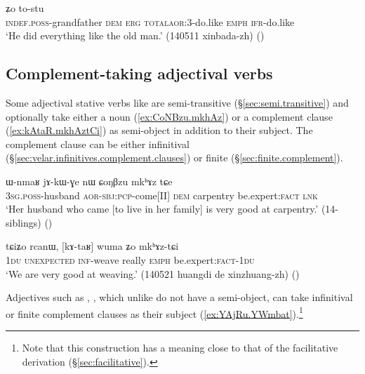 \begin{exe}
\ex \label{ex:tWtastu.tostu2}
 ʑo to-stu \\
\textsc{indef}.\textsc{poss}-grandfather \textsc{dem} \textsc{erg} \textsc{total}\redp{}\textsc{aor}:3\flobv{}-do.like \textsc{emph} \textsc{ifr}-do.like  \\
\glt `He did everything like the old man.' (140511 xinbada-zh)
()
\end{exe}

\subsection{Complement-taking adjectival verbs} \label{sec:adjective.complement}
Some adjectival stative verbs like  are semi-transitive (§\ref{sec:semi.transitive}) and optionally take either a noun (\ref{ex:CoNBzu.mkhAz}) or a complement clause (\ref{ex:kAtaR.mkhAztCi}) as semi-object in addition to their subject. The complement clause can be either infinitival (§\ref{sec:velar.infinitives.complement.clauses}) or finite (§\ref{sec:finite.complement}).

\begin{exe}
\ex \label{ex:CoNBzu.mkhAz}
\gll ɯ-nmaʁ jɤ-kɯ-ɣe nɯ ɕoŋβzu mkʰɤz tɕe \\
\textsc{3sg}.\textsc{poss}-husband \textsc{aor}-\textsc{sbj}:\textsc{pcp}-come[II] \textsc{dem} carpentry be.expert:\textsc{fact} \textsc{lnk} \\
\glt `Her husband who came [to live in her family] is very good at carpentry.' (14-siblings)
()
\end{exe}

\begin{exe}
\ex \label{ex:kAtaR.mkhAztCi}
\gll tɕiʑo rcanɯ, [kɤ-taʁ] wuma ʑo mkʰɤz-tɕi 	 \\
\textsc{1du}  \textsc{unexpected} \textsc{inf}-weave really \textsc{emph} be.expert:\textsc{fact}-\textsc{1du} \\
\glt `We are very good at weaving.' (140521 huangdi de xinzhuang-zh)
()
\end{exe}


Adjectives such as , , which unlike  do not have a semi-object, can take infinitival or finite complement clauses as their subject (\ref{ex:YAjRu.YWmbat}).\footnote{Note that this construction has a meaning close to that of the facilitative  derivation (§\ref{sec:facilitative}). }

